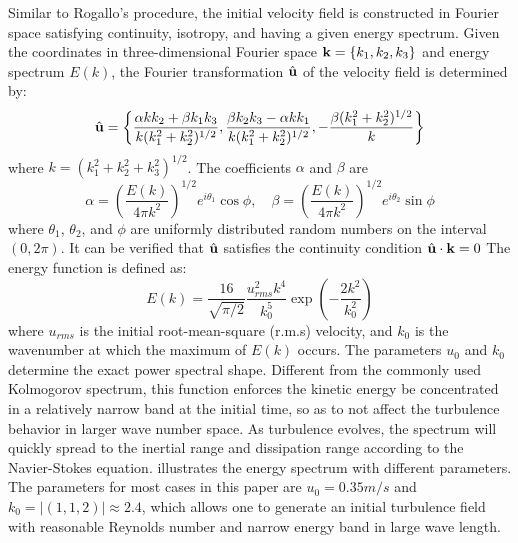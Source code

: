 Similar to Rogallo's procedure, the initial velocity field is constructed in Fourier space satisfying continuity, isotropy, and having a given energy spectrum. Given the coordinates in three-dimensional Fourier space $\mathbf{k} = \{k_1, k_2, k_3\}$ and energy spectrum $E(k)$, the Fourier transformation $\hat{\mathbf{u}}$ of the velocity field is determined by:
\begin{equation}
\hat{\mathbf{u}} = \left\{\frac{\alpha kk_2 + \beta k_1k_3}{k(k_1^2 + k_2^2)^{1/2}},
\frac{\beta k_2k_3 - \alpha k k_1}{k(k_1^2 + k_2^2)^{1/2}}, 
- \frac{\beta (k_1^2 + k_2^2)^{1/2}}{k}\right\}
\end{equation}
where $k = (k_1^2 + k_2^2 + k_3^2)^{1/2}$. The coefficients $\alpha$ and $\beta$ are 
\begin{equation}
\alpha = (\frac{E(k)}{4\pi k^2})^{1/2}e^{i\theta_1}\cos{\phi},\quad
\beta = (\frac{E(k)}{4\pi k^2})^{1/2}e^{i\theta_2}\sin{\phi}
\end{equation}
where $\theta_1$, $\theta_2$, and $\phi$ are uniformly distributed random numbers on the interval $(0, 2\pi)$. It can be verified that $\hat{\mathbf{u}}$ satisfies the continuity condition $\hat{\mathbf{u}}\cdot\mathbf{k} = 0$
The energy function is defined as:
\begin{equation}
E(k) = \frac{16}{\sqrt{\pi/2}}\frac{u^2_{rms}k^4}{k_0^5}\exp(-\frac{2k^2}{k_0^2})
\end{equation}
where $u_{rms}$ is the initial root-mean-square (r.m.s) velocity, and $k_0$ is the wavenumber at which the maximum of $E(k)$ occurs. The parameters $u_0$ and $k_0$ determine
the exact power spectral shape. Different from the commonly used Kolmogorov
spectrum, this function enforces the kinetic energy be concentrated in a
relatively narrow band at the initial time, so as to not affect the turbulence
behavior in larger wave number space. As turbulence evolves, the spectrum will
quickly spread to the inertial range and dissipation range according to the
Navier-Stokes equation.  illustrates the energy spectrum with
different parameters. The parameters for most cases in this paper are $u_0 =
0.35m/s$ and $k_0 = |(1,1,2)| \approx 2.4$, which allows one to generate an
initial turbulence field with reasonable Reynolds number and narrow energy band
in large wave length.

